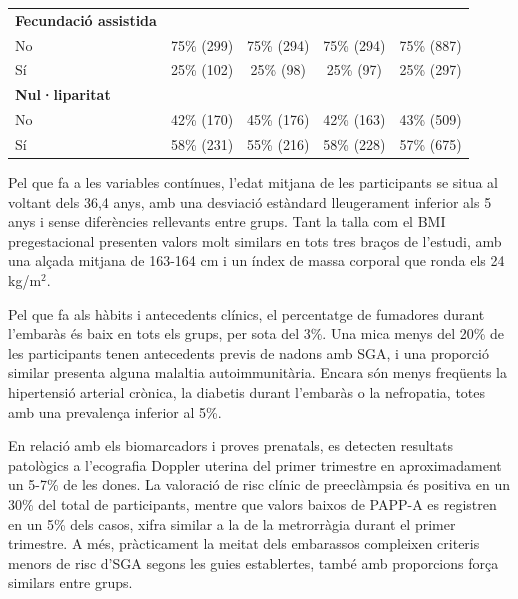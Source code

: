 \documentclass[../main.tex]{subfiles}
\begin{document}
\begin{scriptsize}
\begin{longtable}{lcccc}
          \textbf{Fecundació assistida}     &                &                  &                   &               \\
          \hspace{1em}No        & 75\% (299)     & 75\% (294)       & 75\% (294)        & 75\% (887)    \\
          \hspace{1em}Sí        & 25\% (102)     & 25\% (98)        & 25\% (97)         & 25\% (297)    \\
          \addlinespace
          \textbf{Nul·liparitat}  &                &                  &                   &               \\
          \hspace{1em}No        & 42\% (170)     & 45\% (176)       & 42\% (163)        & 43\% (509)    \\
          \hspace{1em}Sí        & 58\% (231)     & 55\% (216)       & 58\% (228)        & 57\% (675)    \\
        \end{longtable}
    \end{scriptsize}
    

    Pel que fa a les variables contínues, l’edat mitjana de les participants se situa al voltant dels 36,4 anys, amb una desviació estàndard lleugerament inferior als 5 anys i sense diferències rellevants entre grups. Tant la talla com el BMI pregestacional presenten valors molt similars en tots tres braços de l’estudi, amb una alçada mitjana de 163-164 cm i un índex de massa corporal que ronda els 24 kg/m$^2$.\par
    
    Pel que fa als hàbits i antecedents clínics, el percentatge de fumadores durant l’embaràs és baix en tots els grups, per sota del 3\%. Una mica menys del 20\% de les participants tenen antecedents previs de nadons amb SGA, i una proporció similar presenta alguna malaltia autoimmunitària. Encara són menys freqüents la hipertensió arterial crònica, la diabetis durant l’embaràs o la nefropatia, totes amb una prevalença inferior al 5\%. \par
    
    En relació amb els biomarcadors i proves prenatals, es detecten resultats patològics a l’ecografia Doppler uterina del primer trimestre en aproximadament un 5-7\% de les dones. La valoració de risc clínic de preeclàmpsia és positiva en un 30\% del total de participants, mentre que valors baixos de PAPP-A es registren en un 5\% dels casos, xifra similar a la de la metrorràgia durant el primer trimestre. A més, pràcticament la meitat dels embarassos compleixen criteris menors de risc d’SGA segons les guies establertes, també amb proporcions força similars entre grups.\par
    
\end{document}
